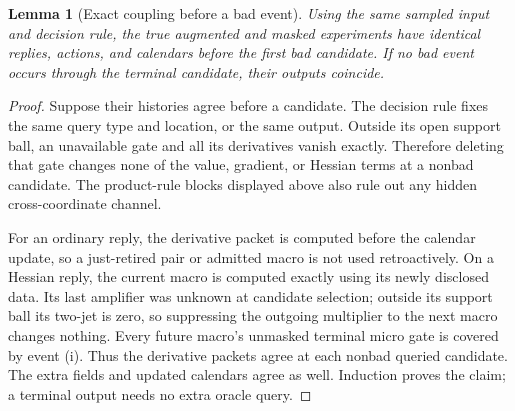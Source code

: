 \documentclass[11pt]{article}
\newtheorem{lemma}[theorem]{Lemma}
\theoremstyle{definition}
\theoremstyle{remark}
\begin{document}
\begin{lemma}[Exact coupling before a bad event]\label{lem:coupling}
Using the same sampled input and decision rule, the true augmented and masked experiments have identical replies, actions, and calendars before the first bad candidate. If no bad event occurs through the terminal candidate, their outputs coincide.
\end{lemma}
\begin{proof}
Suppose their histories agree before a candidate. The decision rule fixes the same query type and location, or the same output. Outside its open support ball, an unavailable gate and all its derivatives vanish exactly. Therefore deleting that gate changes none of the value, gradient, or Hessian terms at a nonbad candidate. The product-rule blocks displayed above also rule out any hidden cross-coordinate channel.

For an ordinary reply, the derivative packet is computed before the calendar update, so a just-retired pair or admitted macro is not used retroactively. On a Hessian reply, the current macro is computed exactly using its newly disclosed data. Its last amplifier was unknown at candidate selection; outside its support ball its two-jet is zero, so suppressing the outgoing multiplier to the next macro changes nothing. Every future macro's unmasked terminal micro gate is covered by event (i). Thus the derivative packets agree at each nonbad queried candidate. The extra fields and updated calendars agree as well. Induction proves the claim; a terminal output needs no extra oracle query.
\end{proof}
\end{document}

